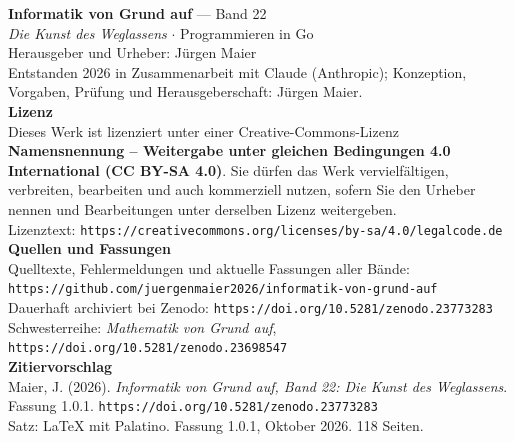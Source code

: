 \clearpage
\thispagestyle{empty}
\vspace*{\fill}
\begin{flushleft}
{\small\color{grau}
\textbf{\color{tief}Informatik von Grund auf} --- Band 22\\[2pt]
\textit{Die Kunst des Weglassens} $\cdot$ Programmieren in Go\\[14pt]

Herausgeber und Urheber: Jürgen Maier\\[2pt]
Entstanden 2026 in Zusammenarbeit mit Claude (Anthropic); Konzeption, Vorgaben, Prüfung und Herausgeberschaft: Jürgen Maier.\\[14pt]

\textbf{Lizenz}\\[2pt]
Dieses Werk ist lizenziert unter einer Creative-Commons-Lizenz \textbf{Namensnennung -- Weitergabe unter gleichen Bedingungen 4.0 International (CC BY-SA 4.0)}. Sie dürfen das Werk vervielfältigen, verbreiten, bearbeiten und auch kommerziell nutzen, sofern Sie den Urheber nennen und Bearbeitungen unter derselben Lizenz weitergeben.\\[2pt]
Lizenztext: \texttt{https://creativecommons.org/licenses/by-sa/4.0/legalcode.de}\\[14pt]

\textbf{Quellen und Fassungen}\\[2pt]
Quelltexte, Fehlermeldungen und aktuelle Fassungen aller Bände:\\
\texttt{https://github.com/juergenmaier2026/informatik-von-grund-auf}\\[2pt]
Dauerhaft archiviert bei Zenodo: \texttt{https://doi.org/10.5281/zenodo.23773283}\\[2pt]
Schwesterreihe: \textit{Mathematik von Grund auf}, \texttt{https://doi.org/10.5281/zenodo.23698547}\\[14pt]

\textbf{Zitiervorschlag}\\[2pt]
Maier, J. (2026). \textit{Informatik von Grund auf, Band 22: Die Kunst des Weglassens}. Fassung 1.0.1. \texttt{https://doi.org/10.5281/zenodo.23773283}\\[14pt]

Satz: \LaTeX{} mit Palatino. Fassung 1.0.1, Oktober 2026. 118 Seiten.
}
\end{flushleft}
\vspace*{1.5cm}
\clearpage
